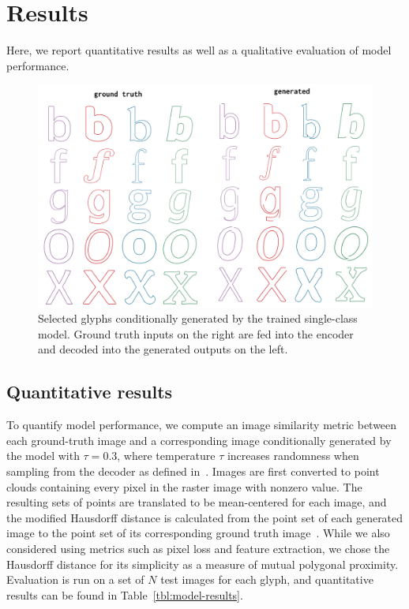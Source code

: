 \section{Results}
Here, we report quantitative results as well as a qualitative evaluation of model performance.
\begin{figure}[h]
    \centering
	\includegraphics[width=\textwidth]{figures/font_gen}
    \caption[Visual results of training single-class model on letter glyph datasets]
    {Selected glyphs conditionally generated by the trained single-class model.
    Ground truth inputs on the right are fed into the encoder and decoded into the generated outputs on the left.\label{fig:font_gen}}
\end{figure}

\subsection{Quantitative results}\label{sec:quant-eval}
To quantify model performance, we compute an image similarity metric between each ground-truth image and a corresponding image conditionally generated by the model with $\tau = 0.3$, where temperature $\tau$ increases randomness when sampling from the decoder as defined in~\cite{ha2017neural}.
Images are first converted to point clouds containing every pixel in the raster image with nonzero value.
The resulting sets of points are translated to be mean-centered for each image, and the modified Hausdorff distance is calculated from the point set of each generated image to the point set of its corresponding ground truth image~\cite{dubuisson1994modified}.
While we also considered using metrics such as pixel loss and feature extraction, we chose the Hausdorff distance for its simplicity as a measure of mutual polygonal proximity.
Evaluation is run on a set of $N$ test images for each glyph, and quantitative results can be found in Table~\ref{tbl:model-results}.

